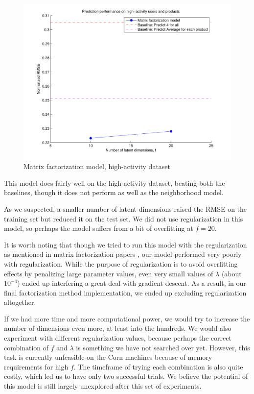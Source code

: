 \documentclass[letterpaper, 11 pt, conference]{ieeeconf}
\begin{document}
\begin{figure}[h]
\includegraphics[scale=0.5]{images/modelthree_subset.pdf}
\caption{Matrix factorization model, high-activity dataset}
\label{fig:modelthree_subset}
\end{figure}

This model does fairly well on the high-activity dataset, beating 
both the baselines, though it does not perform as well as the neighborhood 
model. 

As we suspected, a smaller number of latent dimensions raised the RMSE on the 
training set but reduced it on the test set. We did not use regularization in 
this model, so perhaps the model suffers from a bit of overfitting at 
$f = 20$.

It is worth noting that though we tried to run this model with the 
regularization as mentioned in matrix factorization papers 
\cite{bib:matrixfact}, our model performed very poorly with regularization. 
While the purpose of regularization is to avoid overfitting effects by 
penalizing large parameter values, even very small values 
of $\lambda$ (about $10^{-4}$) ended up interfering a great deal with gradient 
descent. As a result, in our final factorization method implementation,
we ended up excluding regularization altogether.

If we had more time and more computational power, we would try to increase 
the number of dimensions even more, at least into the hundreds. We would also 
experiment with different regularization values, because perhaps the correct 
combination of $f$ and $\lambda$ is something we have not searched over yet. 
However, this task is currently unfeasible on the Corn machines because of 
memory requirements for high $f$. The timeframe of trying each combination is 
also quite costly, which led us to have only two successful trials. We believe 
the potential of this model is still largely unexplored after this set of 
experiments. 
\end{document}
